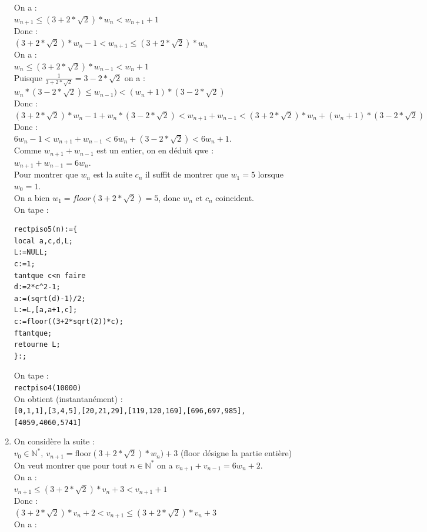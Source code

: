\documentclass[a4paper,11pt]{book}
\newcommand{\N}{{\mathbb{N}}}
\begin{document}
\begin{enumerate}
On a :\\
$w_{n+1}\leq (3+2*\sqrt 2)*w_n<w_{n+1}+1$\\
Donc :\\
$(3+2*\sqrt 2)*w_n-1<w_{n+1}\leq (3+2*\sqrt 2)*w_n$\\
On a :\\
$w_n\leq (3+2*\sqrt 2)*w_{n-1}<w_n+1$\\
Puisque $\displaystyle \frac{1}{3+2*\sqrt 2}=3-2*\sqrt 2$ on a :\\
$w_n*(3-2*\sqrt 2)\leq w_{n-1})<(w_n+1)*(3-2*\sqrt 2)$\\
Donc :\\
$(3+2*\sqrt 2)*w_n-1+w_n*(3-2*\sqrt 2)<w_{n+1}+w_{n-1}<(3+2*\sqrt 2)*w_n+(w_n+1)*(3-2*\sqrt 2)$\\
Donc :\\
$6w_n-1<w_{n+1}+w_{n-1}<6w_n+(3-2*\sqrt 2)<6w_n+1$.\\
Comme $w_{n+1}+w_{n-1}$ est un entier, on en d\'eduit qwe :\\
 $w_{n+1}+w_{n-1}=6w_n$.\\
Pour montrer que $w_n$ est la suite $c_n$ il suffit de montrer que $w_1=5$
lorsque $w_0=1$.\\
On a bien $w_1=floor(3+2*\sqrt 2)=5$, donc $w_n$ et $c_n$ coincident.\\
On tape :
\begin{verbatim}
rectpiso5(n):={
local a,c,d,L;
L:=NULL;
c:=1;
tantque c<n faire
d:=2*c^2-1;
a:=(sqrt(d)-1)/2;
L:=L,[a,a+1,c];
c:=floor((3+2*sqrt(2))*c);
ftantque;
retourne L;
}:;
\end{verbatim}
On tape :\\
{\tt rectpiso4(10000)}\\
On obtient (instantan\'ement) :\\
{\tt [0,1,1],[3,4,5],[20,21,29],[119,120,169],[696,697,985], [4059,4060,5741]}
\item
On consid\`ere la suite :\\
$v_0\in \N^*,\ v_{n+1}=$floor$(3+2*\sqrt 2)*w_n)+3$ (floor d\'esigne la partie 
enti\`ere)\\
On veut montrer que pour tout $n\in \N^*$ on a $v_{n+1}+v_{n-1}=6w_n+2$.\\
On a :\\
$v_{n+1}\leq (3+2*\sqrt 2)*v_n+3<v_{n+1}+1$\\
Donc :\\
$(3+2*\sqrt 2)*v_n+2<v_{n+1}\leq (3+2*\sqrt 2)*v_n+3$\\
On a :\\

\end{enumerate}
\end{document}
